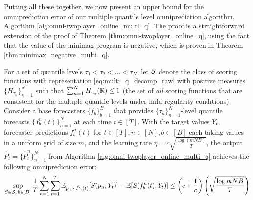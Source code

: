 Putting all these together, we now present an upper bound for the omniprediction error of our multiple quantile level omniprediction algorithm, Algorithm \ref{alg:omni-twoplayer_online_multi_q}. The proof is a straightforward extension of the proof of Theorem \ref{thm:omni-twoplayer_online_q}, using the fact that the value of the minimax program is negative, which is proven in Theorem \ref{thm:minimax_negative_multi_q}.

\begin{theorem}
  \label{thm:omni-twoplayer_online_multi_q}
  For a set of quantile levels $\tau_1 < \tau_2 < ... < \tau_N$, let $\mathcal{S}$ denote the class of scoring functions with representation \eqref{eq:multi_q_decomp_raw} with positive measures $\{H_{\tau_n}\}_{n=1}^N$ such that $\sum_{n=1}^N H_{\tau_n}(\mathbb{R}) \leq 1$ (the set of \textit{all} scoring functions that are consistent for the multiple quantile levels under mild regularity conditions). Consider a base forecasters $\{f_b\}_{b=1}^B$ that provides $\{\tau_n\}_{n=1}^N$-level quantile forecasts $\{f_b^n(t)\}_{n=1}^N$ at each time $t \in [T]$. With the target values $Y_t$, forecaster predictions $f_b^n(t)$ for $t \in [T], n \in [N], b \in [B]$ each taking values in a uniform grid of size $m$, and the learning rate $\eta = c\sqrt{\frac{\log (mNB)}{T}}$, the output $\hat{P}_t = \{\hat{P}_t^n\}_{n=1}^N$ from Algorithm \ref{alg:omni-twoplayer_online_multi_q} achieves the following omniprediction error:
  \begin{align*}
  \sup_{S \in \mathcal{S},\, b \in [B]} \frac{1}{T} \sum_{n=1}^N \sum_{t=1}^T \mathbb{E}_{p_n \sim \hat{P}_n(t)} [S(p_n, Y_t)] - \mathbb{E}[S(f_b^n(t), Y_t)]
  \leq \left(c+\frac{1}{c}\right)\left(\sqrt{\frac{\log mNB}{T}}\right)
  \end{align*}
\end{theorem}

